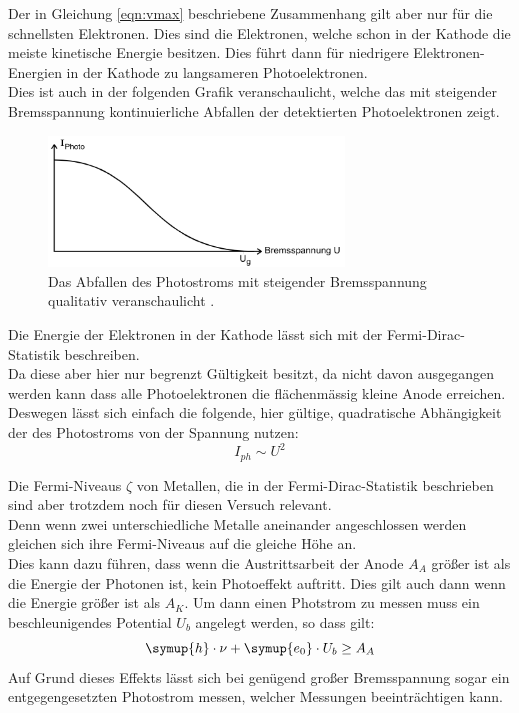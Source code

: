     Der in Gleichung \ref{eqn:vmax} beschriebene Zusammenhang gilt aber nur für die schnellsten Elektronen.
    Dies sind die Elektronen, welche schon in der Kathode die meiste kinetische Energie besitzen. 
    Dies führt dann für niedrigere Elektronen-Energien in der Kathode zu langsameren  Photoelektronen.\\
    Dies ist auch in der folgenden Grafik veranschaulicht, welche das mit steigender Bremsspannung kontinuierliche Abfallen der detektierten Photoelektronen zeigt.

    \begin{figure}[H]
        \centering
        \includegraphics[width=0.7\textwidth]{latex/images/Bremsspannung.PNG}
        \caption{Das Abfallen des Photostroms mit steigender Bremsspannung qualitativ veranschaulicht \protect \cite{500}.}
        \label{img:brems}
    \end{figure}

    \noindent Die Energie der Elektronen in der Kathode lässt sich mit der Fermi-Dirac-Statistik beschreiben.\\
    Da diese aber hier nur begrenzt Gültigkeit besitzt, da nicht davon ausgegangen werden kann dass alle Photoelektronen die flächenmässig kleine Anode erreichen.
    Deswegen lässt sich einfach die folgende, hier gültige, quadratische Abhängigkeit der des Photostroms von der Spannung nutzen:
    \begin{equation}
        I_{ph} \sim U^2
        \label{eqn:quad}
    \end{equation}

    \noindent Die Fermi-Niveaus $\zeta$ von Metallen, die in der Fermi-Dirac-Statistik beschrieben sind aber trotzdem noch für diesen Versuch relevant.\\
    Denn wenn zwei unterschiedliche Metalle aneinander angeschlossen werden gleichen sich ihre Fermi-Niveaus auf die gleiche Höhe an.\\
    Dies kann dazu führen, dass wenn die Austrittsarbeit der Anode $A_A$ größer ist als die Energie der Photonen ist, kein Photoeffekt auftritt.
    Dies gilt auch dann wenn die Energie größer ist als $A_K$.
    Um dann einen Photstrom zu messen muss ein beschleunigendes Potential $U_b$ angelegt werden, so dass gilt:
    \begin{equation*}
        \symup{h} \cdot \nu + \symup{e_0} \cdot U_b \geq A_A
    \end{equation*}
    Auf Grund dieses Effekts lässt sich bei genügend großer Bremsspannung sogar ein entgegengesetzten Photostrom messen, welcher Messungen beeinträchtigen kann.








